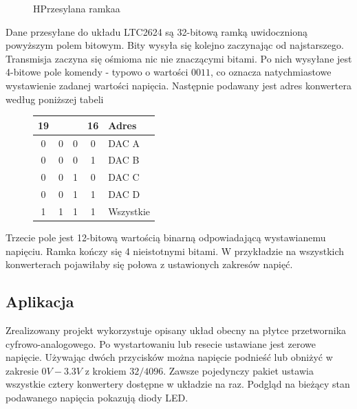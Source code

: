 \documentclass[a4paper,12pt]{article}
\begin{document}
\begin{figure}[htb]
  \centering
	\begin{register}{H}{Przesylana ramka}{a}
	\label{dacprotocol}%
	\end{register}
\end{figure}

Dane przesyłane do układu LTC2624 są 32-bitową ramką uwidocznioną powyższym polem bitowym. Bity wysyła się kolejno zaczynając od najstarszego. Transmisja zaczyna się ośmioma nic nie znaczącymi bitami. Po nich wysyłane jest 4-bitowe pole komendy - typowo o wartości $0011$, co oznacza natychmiastowe wystawienie zadanej wartości napięcia. Następnie podawany jest adres konwertera według poniższej tabeli

\begin{figure}[htb]
  \centering
	\begin{tabular}{|c|c|c|c|l|}
	  \multicolumn{1}{r}{19}&\multicolumn{1}{r}{}&\multicolumn{1}{r}{}&\multicolumn{1}{r}{16}&\multicolumn{1}{l}{Adres}\\
		\hline
		0&0&0&0 & DAC A\\
		\hline
		0&0&0&1 & DAC B\\
		\hline
		0&0&1&0 & DAC C\\
		\hline
		0&0&1&1 & DAC D\\
		\hline
		1&1&1&1 & Wszystkie\\
		\hline
	\end{tabular}
\end{figure}

Trzecie pole jest 12-bitową wartością binarną odpowiadającą wystawianemu napięciu. Ramka kończy się 4 nieistotnymi bitami. W przykładzie na wszystkich konwerterach pojawiłaby się połowa z ustawionych zakresów napięć.


\subsection{Aplikacja}

Zrealizowany projekt wykorzystuje opisany układ obecny na płytce przetwornika cyfrowo-analogowego. Po wystartowaniu lub resecie ustawiane jest zerowe napięcie. Używając dwóch przycisków można napięcie podnieść lub obniżyć w zakresie $0V - 3.3V$ z krokiem $32 / 4096$. Zawsze pojedynczy pakiet ustawia wszystkie cztery konwertery dostępne w układzie na raz. Podgląd na bieżący stan podawanego napięcia pokazują diody LED.
\end{document}

